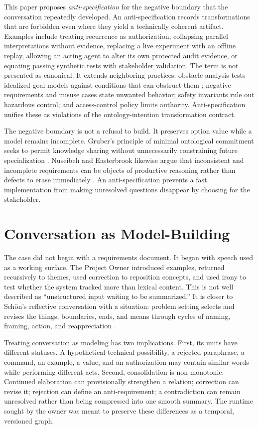 \documentclass[10pt,a4paper]{article}
\begin{document}
This paper proposes \emph{anti-specification} for the negative boundary that the conversation repeatedly developed. An anti-specification records transformations that are forbidden even where they yield a technically coherent artifact. Examples include treating recurrence as authorization, collapsing parallel interpretations without evidence, replacing a live experiment with an offline replay, allowing an acting agent to alter its own protected audit evidence, or equating passing synthetic tests with stakeholder validation. The term is not presented as canonical. It extends neighboring practices: obstacle analysis tests idealized goal models against conditions that can obstruct them \cite{vanlamsweerde2000}; negative requirements and misuse cases state unwanted behavior; safety invariants rule out hazardous control; and access-control policy limits authority. Anti-specification unifies these as violations of the ontology-intention transformation contract.

The negative boundary is not a refusal to build. It preserves option value while a model remains incomplete. Gruber's principle of minimal ontological commitment seeks to permit knowledge sharing without unnecessarily constraining future specialization \cite{gruber1995}. Nuseibeh and Easterbrook likewise argue that inconsistent and incomplete requirements can be objects of productive reasoning rather than defects to erase immediately \cite{nuseibeh2000}. An anti-specification prevents a fast implementation from making unresolved questions disappear by choosing for the stakeholder.

\section{Conversation as Model-Building}

The case did not begin with a requirements document. It began with speech used as a working surface. The Project Owner introduced examples, returned recursively to themes, used correction to reposition concepts, and used irony to test whether the system tracked more than lexical content. This is not well described as ``unstructured input waiting to be summarized.'' It is closer to Sch\"on's reflective conversation with a situation: problem setting selects and revises the things, boundaries, ends, and means through cycles of naming, framing, action, and reappreciation \cite{schon1983,schon1992}.

Treating conversation as modeling has two implications. First, its units have different statuses. A hypothetical technical possibility, a rejected paraphrase, a command, an example, a value, and an authorization may contain similar words while performing different acts. Second, consolidation is non-monotonic. Continued elaboration can provisionally strengthen a relation; correction can revise it; rejection can define an anti-requirement; a contradiction can remain unresolved rather than being compressed into one smooth summary. The runtime sought by the owner was meant to preserve these differences as a temporal, versioned graph.
\end{document}
